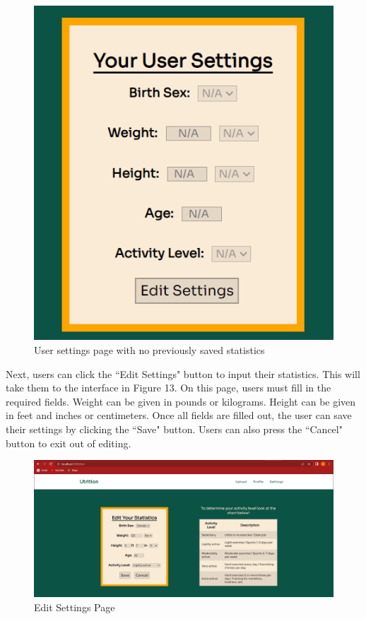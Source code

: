 \documentclass{article}
\begin{document}
\begin{figure}[H]
	\centering
	\includegraphics[scale=0.70]{settingspage.png}
	\caption{User settings page with no previously saved statistics}
\end{figure}

Next, users can click the ``Edit Settings" button to input their statistics. This will take them to the interface in Figure 13. On this page, users must fill in the required fields. Weight can be given in pounds or kilograms. Height can be given in feet and inches or centimeters. Once all fields are filled out, the user can save their settings by clicking the ``Save" button. Users can also press the ``Cancel" button to exit out of editing.

\begin{figure}[H]
	\centering
	\includegraphics[scale=0.30]{editingsettings.png}
	\caption{Edit Settings Page}
\end{figure}
\end{document}
